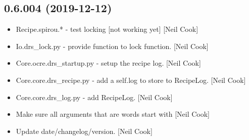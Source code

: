 \documentclass[a4paper,10pt,english]{report}
\begin{document}
\subsection{0.6.004 (2019-12-12)}
\label{\detokenize{misc/changelog:id13}}\begin{itemize}
\item {} 
Recipe.spirou.* - test locking {[}not working yet{]} {[}Neil Cook{]}

\item {} 
Io.drs\_lock.py - provide function to lock function. {[}Neil Cook{]}

\item {} 
Core.ocre.drs\_startup.py - setup the recipe log. {[}Neil Cook{]}

\item {} 
Core.core.drs\_recipe.py - add a self.log to store to RecipeLog. {[}Neil
Cook{]}

\item {} 
Core.core.drs\_log.py - add RecipeLog. {[}Neil Cook{]}

\item {} 
Make sure all arguments that are words start with \textendash{} {[}Neil Cook{]}

\item {} 
Update date/changelog/version. {[}Neil Cook{]}

\end{itemize}
\end{document}
